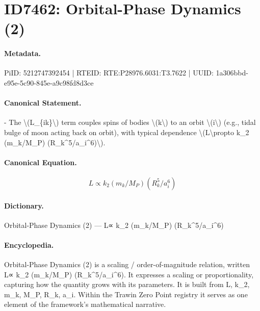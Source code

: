 \section*{ID7462: Orbital-Phase Dynamics (2)}
\paragraph{Metadata.}
PiID: 5212747392454 | RTEID: RTE:P28976.6031:T3.7622 | UUID: 1a306bbd-e95e-5c90-845e-a9c98fd8d3ce

\paragraph{Canonical Statement.}
- The \textbackslash{}(L\_\{ik\}\textbackslash{}) term couples spins of bodies \textbackslash{}(k\textbackslash{}) to an orbit \textbackslash{}(i\textbackslash{}) (e.g., tidal bulge of moon acting back on orbit), with typical dependence \textbackslash{}(L\textbackslash{}propto k\_2 (m\_k/M\_P) (R\_k\textasciicircum{}5/a\_i\textasciicircum{}6)\textbackslash{}).

\paragraph{Canonical Equation.}
\[
L\propto k_2 (m_k/M_P) (R_k^5/a_i^6)
\]

\paragraph{Dictionary.}
Orbital-Phase Dynamics (2) — L∝ k\_2 (m\_k/M\_P) (R\_k\textasciicircum{}5/a\_i\textasciicircum{}6)

\paragraph{Encyclopedia.}
Orbital-Phase Dynamics (2) is a scaling / order-of-magnitude relation, written L∝ k\_2 (m\_k/M\_P) (R\_k\textasciicircum{}5/a\_i\textasciicircum{}6). It expresses a scaling or proportionality, capturing how the quantity grows with its parameters. It is built from L, k\_2, m\_k, M\_P, R\_k, a\_i. Within the Trawin Zero Point registry it serves as one element of the framework's mathematical narrative.
